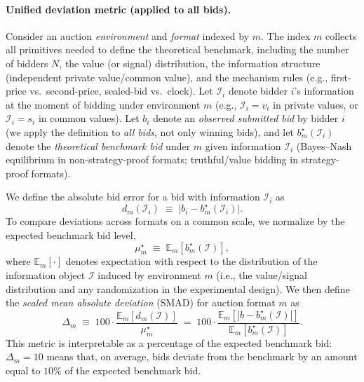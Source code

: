 \documentclass[acmsmall,screen,review]{acmart}
\begin{document}
\paragraph{Unified deviation metric (applied to all bids).}
Consider an auction \emph{environment} and \emph{format} indexed by $m$.
The index $m$ collects all primitives needed to define the theoretical benchmark, including the number of bidders $N$, the value (or signal) distribution, the information structure (independent private value/common value), and the mechanism rules (e.g., first-price vs.\ second-price, sealed-bid vs.\ clock).
Let $\mathcal I_i$ denote bidder $i$'s information at the moment of bidding under environment $m$ (e.g., $\mathcal I_i=v_i$ in private values, or $\mathcal I_i=s_i$ in common values).
Let $b_{i}$ denote an \emph{observed submitted bid} by bidder $i$ (we apply the definition to \emph{all bids}, not only winning bids), and let $b_m^\star(\mathcal I_i)$ denote the \emph{theoretical benchmark bid} under $m$ given information $\mathcal I_i$ (Bayes--Nash equilibrium in non-strategy-proof formats; truthful/value bidding in strategy-proof formats).

\noindent We define the absolute bid error for a bid with information $\mathcal I_i$ as
\[
d_m(\mathcal I_i)\;\equiv\;\bigl|b_i - b_m^\star(\mathcal I_i)\bigr|.
\]
To compare deviations across formats on a common scale, we normalize by the expected benchmark bid level,
\[
\mu_m^\star \;\equiv\; \mathbb E_m\!\left[b_m^\star(\mathcal I)\right],
\]
where $\mathbb E_m[\cdot]$ denotes expectation with respect to the distribution of the information object $\mathcal I$ induced by environment $m$ (i.e., the value/signal distribution and any randomization in the experimental design).
We then define the \emph{scaled mean absolute deviation} (SMAD) for auction format $m$ as
\[
\Delta_m \;\equiv\; 100 \cdot \frac{\mathbb E_m\!\left[d_m(\mathcal I)\right]}{\mu_m^\star}
\;=\; 100 \cdot \frac{\mathbb E_m\!\left[\left|b-b_m^\star(\mathcal I)\right|\right]}{\mathbb E_m\!\left[b_m^\star(\mathcal I)\right]}.
\]
This metric is interpretable as a percentage of the expected benchmark bid: $\Delta_m=10$ means that, on average, bids deviate from the benchmark by an amount equal to $10\%$ of the expected benchmark bid.
\end{document}
